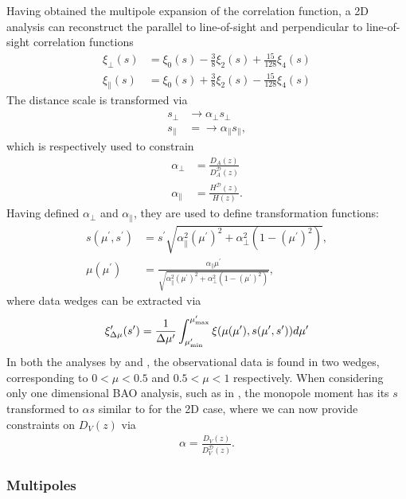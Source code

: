 \documentclass[titlesmallcaps, examinerscopy, copyrightpage]{uqthesis}
\begin{document}
Having obtained the multipole expansion of the correlation function, a 2D analysis can reconstruct the parallel to line-of-sight and perpendicular to line-of-sight correlation functions \citep{KazinSanchezBlanton2012, SanchezKazinBeutler2013}
\begin{align}
\xi_\perp(s) &= \xi_0(s) - \frac{3}{8} \xi_2(s) + \frac{15}{128} \xi_4(s) \\
\xi_\parallel(s) &= \xi_0(s) + \frac{3}{8} \xi_2(s) - \frac{15}{128} \xi_4(s)
\end{align}
The distance scale is transformed via
\begin{align}
s_\perp &\rightarrow \alpha_\perp s_\perp \\
s_\parallel &= \rightarrow \alpha_\parallel s_\parallel,
\end{align}
which is respectively used to constrain
\begin{align}
\alpha_\perp &= \frac{D_A(z)}{D_A^{\mathcal{D}}(z)} \\
\alpha_\parallel &= \frac{H^{\mathcal{D}}(z)}{H(z)}.
\end{align}
Having defined $\alpha_\perp$ and $\alpha_\parallel$, they are used to define transformation functions:
\begin{align}
s(\mu^\prime, s^\prime) &= s^\prime \sqrt{\alpha_\parallel^2(\mu^\prime)^2 + \alpha_\perp^2 (1 - (\mu^\prime)^2)}, \\
\mu(\mu^\prime) &= \frac{\alpha_\parallel \mu^\prime}{\sqrt{\alpha_\parallel^2(\mu^\prime)^2 + \alpha_\perp^2 (1 - (\mu^\prime)^2)}},
\end{align}
where data wedges can be extracted via
\begin{align}
\xi^\prime_{\Delta \mu}(s^\prime) = \frac{1}{\Delta \mu^\prime} \int_{\mu^\prime_{\rm{min}}}^{\mu^\prime_{\rm{max}}} \xi(\mu(\mu^\prime), s(\mu^\prime, s^\prime)) d\mu^\prime
\end{align}
In both the analyses by \citet{KazinSanchezBlanton2012} and \citet{SanchezKazinBeutler2013}, the observational data is found in two wedges, corresponding to $0 < \mu < 0.5$ and $0.5 < \mu < 1$ respectively. When considering only one dimensional BAO analysis, such as in \citet{BlakeDavis2011}, the monopole moment has its $s$ transformed to $\alpha s$ similar to for the 2D case, where we can now provide constraints on $D_V(z)$ via
\begin{align}
\alpha = \frac{D_V(z)}{D_V^{\mathcal{D}}(z)}.
\end{align}

\subsubsection{Multipoles} \label{sec:prior:cor:mp}
\end{document}

